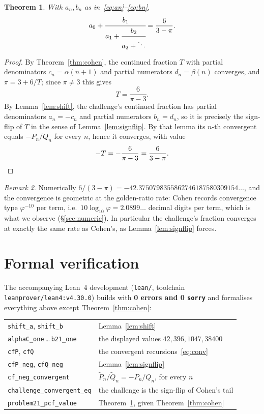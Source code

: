 \documentclass[11pt]{article}
\newtheorem{theorem}{Theorem}[section]
\theoremstyle{remark}
\newtheorem{remark}[theorem]{Remark}
\begin{document}
\begin{theorem}\label{thm:main}
With $a_n,b_n$ as in~\eqref{eq:an}--\eqref{eq:bn},
\[
a_0 + \cfrac{b_1}{a_1 + \cfrac{b_2}{a_2 + \ddots}} = \frac{6}{3-\pi}.
\]
\end{theorem}

\begin{proof}
By Theorem~\ref{thm:cohen}, the continued fraction $T$ with partial denominators
$c_n = \alpha(n+1)$ and partial numerators $d_n = \beta(n)$ converges, and
$\pi = 3 + 6/T$; since $\pi \ne 3$ this gives
\[
T = \frac{6}{\pi - 3}.
\]
By Lemma~\ref{lem:shift}, the challenge's continued fraction has partial
denominators $a_n = -c_n$ and partial numerators $b_n = d_n$, so it is precisely
the sign-flip of $T$ in the sense of Lemma~\ref{lem:signflip}. By that lemma its
$n$-th convergent equals $-P_n/Q_n$ for every $n$, hence it converges, with
value
\[
-T = -\frac{6}{\pi-3} = \frac{6}{3-\pi}. \qedhere
\]
\end{proof}

\begin{remark}
Numerically $6/(3-\pi) = -42.3750798355862746187580309154\ldots$, and the
convergence is geometric at the golden-ratio rate: Cohen records convergence
type $\varphi^{-10}$ per term, i.e.\ $10\log_{10}\varphi = 2.0899\ldots$ decimal
digits per term, which is what we observe (\S\ref{sec:numeric}). In particular
the challenge's fraction converges at exactly the same rate as Cohen's, as
Lemma~\ref{lem:signflip} forces.
\end{remark}

\section{Formal verification}\label{sec:formal}

The accompanying Lean~4 development (\texttt{lean/}, toolchain
\texttt{leanprover/lean4:v4.30.0}) builds with \textbf{0 errors and
0 \texttt{sorry}} and formalises everything above except
Theorem~\ref{thm:cohen}:

\begin{center}
\begin{tabular}{ll}
\texttt{shift\_a}, \texttt{shift\_b} & Lemma~\ref{lem:shift}\\
\texttt{alphaC\_one}\,\dots\,\texttt{b21\_one} & the displayed values $42,396,1047,38400$\\
\texttt{cfP}, \texttt{cfQ} & the convergent recursions~\eqref{eq:conv}\\
\texttt{cfP\_neg}, \texttt{cfQ\_neg} & Lemma~\ref{lem:signflip}\\
\texttt{cf\_neg\_convergent} & $\widetilde P_n/\widetilde Q_n = -P_n/Q_n$, for every $n$\\
\texttt{challenge\_convergent\_eq} & the challenge is the sign-flip of Cohen's tail\\
\texttt{problem21\_pcf\_value} & Theorem~\ref{thm:main}, given Theorem~\ref{thm:cohen}\\
\end{tabular}
\end{center}
\end{document}
